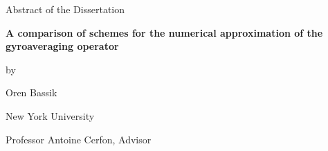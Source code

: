 \documentclass[12pt,letterpaper]{article}
\newcommand{\thesistitle}{A comparison of schemes for the numerical approximation of the gyroaveraging operator}
\newcommand{\thesisauthor}{Oren Bassik}
\newcommand{\thesisadvisor}{Professor Antoine Cerfon}
\begin{document}
  \begin{center}
    Abstract of the Dissertation\bigskip

    \textbf{\thesistitle}\bigskip

    by\bigskip

    \thesisauthor\bigskip

    New York University\bigskip

    \thesisadvisor, Advisor
  \end{center}
\bigskip


\end{document}
